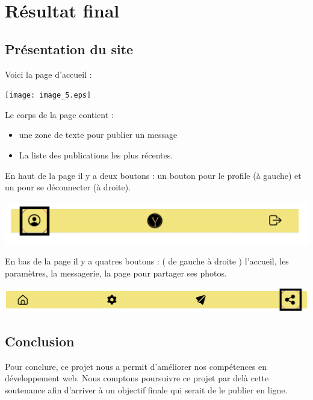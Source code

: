 \documentclass[12pt,a4paper]{article}
\begin{document}
\section{Résultat final}
\subsection{Présentation du site}

\graphicspath{ {./} }

Voici la page d'accueil :
\begin{center}
  \texttt{[image: image\_5.eps]}
\end{center}
Le corps de la page contient :
\begin{itemize}      

    \item une zone de texte pour publier un message
    \item La liste des publications les plus récentes.
      
\end{itemize}

\newpage

En haut de la page il y a deux boutons : un bouton pour le profile (à gauche) et un pour se déconnecter (à droite).
\begin{center}
  \includegraphics[scale=0.3]{image_1.eps}
\end{center}

En bas de la page il y a quatres boutons : ( de gauche à droite ) l'accueil, les paramètres, la messagerie, la page pour partager ses photos.
\begin{center}
  \includegraphics[scale=0.2]{image_3.eps}
\end{center}

\subsection{Conclusion}

Pour conclure, ce projet nous a permit d'améliorer nos compétences en développement web.
Nous comptons poursuivre ce projet par delà cette soutenance afin d'arriver à un objectif finale qui serait de le publier en ligne.
\end{document}
